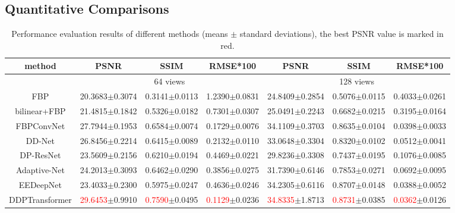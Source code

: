 \documentclass[lettersize,journal]{IEEEtran}
\begin{document}
\subsection{Quantitative Comparisons}
\begin{table}[!t]
	\caption{Performance evaluation results of different methods (means $\pm$ standard deviations), the best PSNR value is marked in red.}\label{tab1}
	\centering
	\begin{tabular}{cccc|ccc}
		\hline
		method & PSNR & SSIM & RMSE*100 & PSNR & SSIM& RMSE*100 \\ 
		\hline
		& \multicolumn{3}{c|}{64 views} & \multicolumn{3}{c}{128 views} \\ \hline
		FBP & 20.3683$\pm$0.3074 
		& 0.3141$\pm$0.0113 
		& 1.2390$\pm$0.0831
		& 24.8409$\pm$0.2854 
		& 0.5076$\pm$0.0115
		& 0.4033$\pm$0.0261 \\
		bilinear+FBP 
		& 21.4815$\pm$0.1842
		& 0.5326$\pm$0.0182
		& 0.7301$\pm$0.0307
		& 25.0491$\pm$0.2243
		& 0.6682$\pm$0.0215 
		& 0.3195$\pm$0.0164 \\
		FBPConvNet 
		& 27.7944$\pm$0.1953 
		& 0.6584$\pm$0.0074 
		& 0.1729$\pm$0.0076
		& 34.1109$\pm$0.3703
		& 0.8635$\pm$0.0104
		& 0.0398$\pm$0.0033 \\
		DD-Net 
		& 26.8456$\pm$0.2214
		& 0.6415$\pm$0.0089 
		& 0.2132$\pm$0.0110
		& 33.0648$\pm$0.3304
		& 0.8320$\pm$0.0102
		& 0.0512$\pm$0.0041 \\			
		DP-ResNet 
		& 23.5609$\pm$0.2156
		& 0.6210$\pm$0.0194
		& 0.4469$\pm$0.0221
		& 29.8236$\pm$0.3308
		& 0.7437$\pm$0.0195
		& 0.1076$\pm$0.0085 \\
		Adaptive-Net 
		& 24.2013$\pm$0.3093 
		& 0.6462$\pm$0.0290
		& 0.3856$\pm$0.0275			
		& 31.7390$\pm$0.6146
		& 0.7853$\pm$0.0271 
		& 0.0692$\pm$0.0095 \\
		EEDeepNet 
		& 23.4033$\pm$0.2300 
		& 0.5975$\pm$0.0247
		& 0.4636$\pm$0.0246 
		& 34.2305$\pm$0.6116 
		& 0.8707$\pm$0.0148 
		& 0.0388$\pm$0.0052 \\
		DDPTransformer 
		& \textcolor{red}{29.6453}$\pm$0.9910
		& \textcolor{red}{0.7590}$\pm$0.0495
		& \textcolor{red}{0.1129}$\pm$0.0236
		& \textcolor{red}{34.8335}$\pm$1.8713
		& \textcolor{red}{0.8731}$\pm$0.0385
		& \textcolor{red}{0.0362}$\pm$0.0126 \\ 
		\hline
	\end{tabular}
\end{table}
\end{document}
